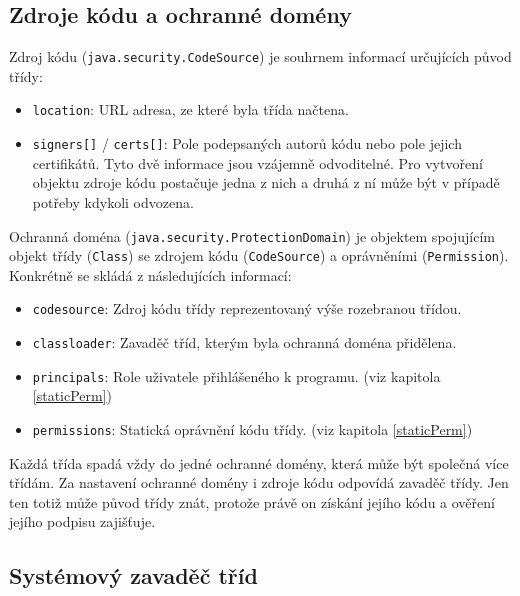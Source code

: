 \subsection{Zdroje kódu a ochranné domény} \label{codeSourceAprotectionDomains}

Zdroj kódu ({\tt java.security.CodeSource}) je souhrnem informací určujících původ třídy: \cite{sourceCodeSource}

\begin{itemize}
  \item {\tt location}: URL adresa, ze které byla třída načtena.
  \item {\tt signers[]} / {\tt certs[]}: Pole podepsaných autorů kódu nebo pole jejich certifikátů. Tyto dvě informace jsou vzájemně odvoditelné. Pro vytvoření objektu zdroje kódu postačuje jedna z nich a druhá z ní může být v případě potřeby kdykoli odvozena.
\end{itemize}

Ochranná doména ({\tt java.security.ProtectionDomain}) je objektem spojujícím objekt třídy ({\tt Class}) se zdrojem kódu ({\tt CodeSource}) a oprávněními ({\tt Permission}). Konkrétně se skládá z následujících informací: \cite{sourceProtectionDomain}

\begin{itemize}
  \item {\tt codesource}: Zdroj kódu třídy reprezentovaný výše rozebranou třídou.
  \item {\tt classloader}: Zavaděč tříd, kterým byla ochranná doména přidělena.
  \item {\tt principals}: Role uživatele přihlášeného k programu. (viz kapitola \ref{staticPerm})
  \item {\tt permissions}: Statická oprávnění kódu třídy. (viz kapitola \ref{staticPerm})
\end{itemize}

Každá třída spadá vždy do jedné ochranné domény, která může být společná více třídám. Za nastavení ochranné domény i zdroje kódu odpovídá zavaděč třídy.
Jen ten totiž může původ třídy znát, protože právě on získání jejího kódu a ověření jejího podpisu zajišťuje.

\subsection{Systémový zavaděč tříd} \label{interniZavadec}

